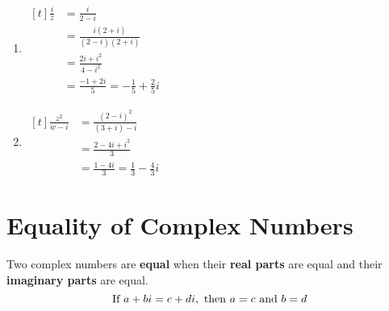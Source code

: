 \documentclass[11pt,a4paper]{book}
\begin{document}
\begin{example}
\begin{minipage}[t]{0.5\textwidth}
\begin{enumerate}[label=(\alph*)]
\end{enumerate}

\end{minipage}
\begin{minipage}[t]{0.5\textwidth}

\begin{enumerate}[label=(\alph*),start=2]

\item
$
\begin{aligned}[t]
\frac{i}{z} & =\frac{i}{2-i}\\
 & =\frac{i\left(2+i\right)}{\left(2-i\right)\left(2+i\right)}\\
 & =\frac{2i+i^{2}}{4-i^{2}}\\
 & =\frac{-1+2i}{5}=-\frac{1}{5}+\frac{2}{5}i
\end{aligned}
$

\addtocounter{enumi}{1}

\item
$
\begin{aligned}[t]
\frac{z^{2}}{w-i} & =\frac{\left(2-i\right)^{2}}{\left(3+i\right)-i}\\
 & =\frac{2-4i+i^{2}}{3}\\
 & =\frac{1-4i}{3}=\frac{1}{3}-\frac{4}{3}i
\end{aligned}
$

\end{enumerate}

\end{minipage}

\end{example}

\newpage

\section{Equality of Complex Numbers}

\begin{tcolorbox}[colback=blue!5, colframe=black, boxrule=.4pt, sharpish corners]

Two complex numbers are \textbf{equal} when their \textbf{real parts}
are equal and their \textbf{imaginary parts} are equal.
\[
\text{If }a+bi=c+di,\text{ then }a=c\text{\text{ and }}b=d
\]
\end{tcolorbox}
\end{document}
